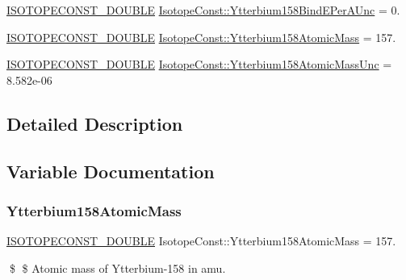 \begin{DoxyCompactItemize}
\mbox{\hyperlink{group___isotope_const-_macros_ga8f45a7272ce02c0b4c65c44636ed719a}{I\+S\+O\+T\+O\+P\+E\+C\+O\+N\+S\+T\+\_\+\+D\+O\+U\+B\+LE}} \mbox{\hyperlink{group___isotope_const-_ytterbium-_yb158_gad8cd94648b025cd7f94035abeeba1f11}{Isotope\+Const\+::\+Ytterbium158\+Bind\+E\+Per\+A\+Unc}} = 0.
\item 
\mbox{\hyperlink{group___isotope_const-_macros_ga8f45a7272ce02c0b4c65c44636ed719a}{I\+S\+O\+T\+O\+P\+E\+C\+O\+N\+S\+T\+\_\+\+D\+O\+U\+B\+LE}} \mbox{\hyperlink{group___isotope_const-_ytterbium-_yb158_ga653ef470add6f1373c001dbda02c49ff}{Isotope\+Const\+::\+Ytterbium158\+Atomic\+Mass}} = 157.
\item 
\mbox{\hyperlink{group___isotope_const-_macros_ga8f45a7272ce02c0b4c65c44636ed719a}{I\+S\+O\+T\+O\+P\+E\+C\+O\+N\+S\+T\+\_\+\+D\+O\+U\+B\+LE}} \mbox{\hyperlink{group___isotope_const-_ytterbium-_yb158_ga7728cefb267ac107f02fb289c1c422bd}{Isotope\+Const\+::\+Ytterbium158\+Atomic\+Mass\+Unc}} = 8.\+582e-\/06
\end{DoxyCompactItemize}


\subsection{Detailed Description}


\subsection{Variable Documentation}
\mbox{\label{group___isotope_const-_ytterbium-_yb158_ga653ef470add6f1373c001dbda02c49ff}} 
\subsubsection{\texorpdfstring{Ytterbium158\+Atomic\+Mass}{Ytterbium158AtomicMass}}
{\footnotesize\ttfamily \mbox{\hyperlink{group___isotope_const-_macros_ga8f45a7272ce02c0b4c65c44636ed719a}{I\+S\+O\+T\+O\+P\+E\+C\+O\+N\+S\+T\+\_\+\+D\+O\+U\+B\+LE}} Isotope\+Const\+::\+Ytterbium158\+Atomic\+Mass = 157.}

\$ \$ Atomic mass of Ytterbium-\/158 in amu. \mbox{\label{group___isotope_const-_ytterbium-_yb158_ga7728cefb267ac107f02fb289c1c422bd}} 
